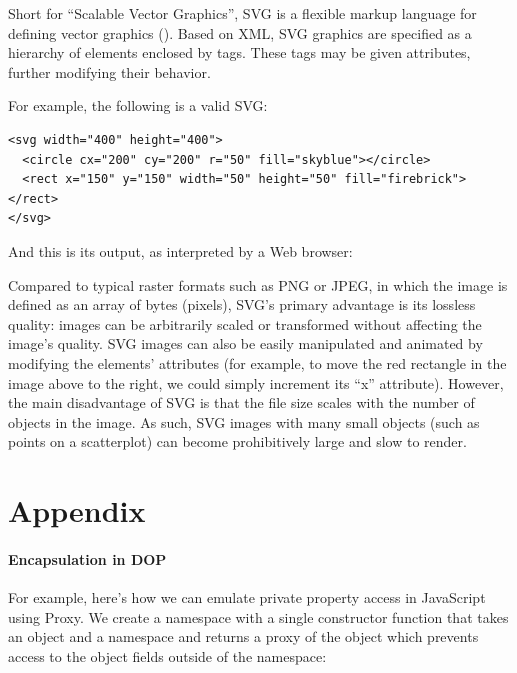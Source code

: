 \documentclass[
]{book}
\theoremstyle{definition}
\theoremstyle{definition}
\theoremstyle{definition}
\theoremstyle{definition}
\theoremstyle{remark}
\begin{document}
Short for ``Scalable Vector Graphics'', SVG is a flexible markup language for defining vector graphics (). Based on XML, SVG graphics are specified as a hierarchy of elements enclosed by tags. These tags may be given attributes, further modifying their behavior.

For example, the following is a valid SVG:

\begin{verbatim}
<svg width="400" height="400">
  <circle cx="200" cy="200" r="50" fill="skyblue"></circle>
  <rect x="150" y="150" width="50" height="50" fill="firebrick"></rect>
</svg>
\end{verbatim}

And this is its output, as interpreted by a Web browser:

Compared to typical raster formats such as PNG or JPEG, in which the image is defined as an array of bytes (pixels), SVG's primary advantage is its lossless quality: images can be arbitrarily scaled or transformed without affecting the image's quality. SVG images can also be easily manipulated and animated by modifying the elements' attributes (for example, to move the red rectangle in the image above to the right, we could simply increment its ``x'' attribute). However, the main disadvantage of SVG is that the file size scales with the number of objects in the image. As such, SVG images with many small objects (such as points on a scatterplot) can become prohibitively large and slow to render.

\chapter{Appendix}\label{appendix}

\subsubsection{Encapsulation in DOP}\label{dop-encapsulation}

For example, here's how we can emulate private property access in JavaScript using Proxy. We create a namespace with a single constructor function that takes an object and a namespace and returns a proxy of the object which prevents access to the object fields outside of the namespace:
\end{document}
